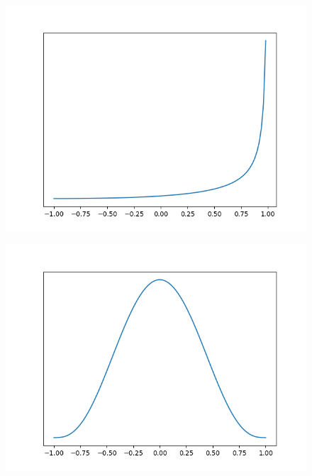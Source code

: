 \begin{figure}[!h]
    \centering
    \includegraphics[scale=0.5]
    {./content/figures/dists/beta_3_0.3}
    \caption{}
    \label{fig:beta-3-0.3}
\end{figure}

\begin{figure}[!h]
    \centering
    \includegraphics[scale=0.5]
    {./content/figures/dists/beta_4_4}
    \caption{}
    \label{fig:beta-4-4}
\end{figure}

